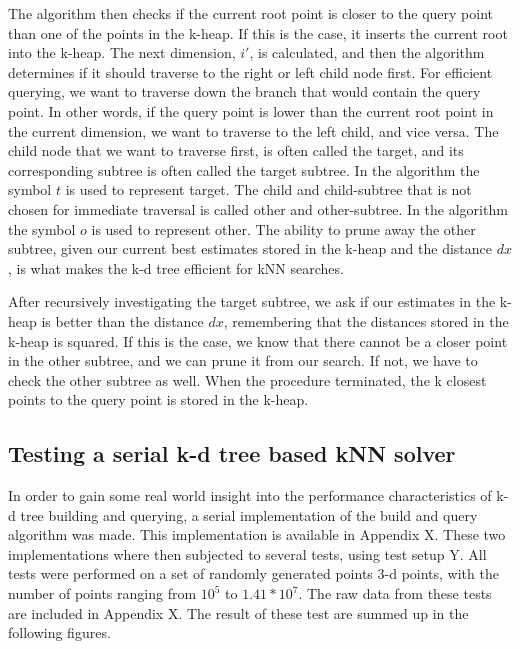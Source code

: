 The algorithm then checks if the current root point is closer to the query point than one of the points in the k-heap. If this is the case, it inserts the current root into the k-heap. The next dimension, $i'$, is calculated, and then the algorithm determines if it should traverse to the right or left child node first. For efficient querying, we want to traverse down the branch that would contain the query point. In other words, if the query point is lower than the current root point in the current dimension, we want to traverse to the left child, and vice versa. The child node that we want to traverse first, is often called the target, and its corresponding subtree is often called the target subtree. In the algorithm the symbol $t$ is used to represent target. The child and child-subtree that is not chosen for immediate traversal is called other and other-subtree. In the algorithm the symbol $o$ is used to represent other. The ability to prune away the other subtree, given our current best estimates stored in the k-heap and the distance $dx$, is what makes the k-d tree efficient for kNN searches.

After recursively investigating the target subtree, we ask if our estimates in the k-heap is better than the distance $dx$, remembering that the distances stored in the k-heap is squared. If this is the case, we know that there cannot be a closer point in the other subtree, and we can prune it from our search. If not, we have to check the other subtree as well. When the procedure terminated, the k closest points to the query point is stored in the k-heap.

\subsection{Testing a serial k-d tree based kNN solver} %
\label{sub:testing_a_serial_k_d_tree_based_knn_solver}

In order to gain some real world insight into the performance characteristics of k-d tree building and querying, a serial implementation of the build and query algorithm was made. This implementation is available in Appendix X. These two implementations where then subjected to several tests, using test setup Y. All tests were performed on a set of randomly generated points 3-d points, with the number of points ranging from $10^5$ to $1.41*10^7$. The raw data from these tests are included in Appendix X. The result of these test are summed up in the following figures.

